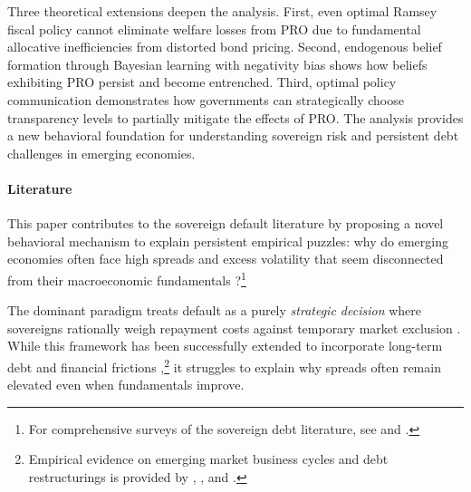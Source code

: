 \documentclass[12pt]{article}
\theoremstyle{plain}
\begin{document}
Three theoretical extensions deepen the analysis. First, even optimal Ramsey
fiscal policy cannot eliminate welfare losses from PRO due to fundamental
allocative inefficiencies from distorted bond pricing. Second, endogenous
belief formation through Bayesian learning with negativity bias shows how
beliefs exhibiting PRO persist and become entrenched. Third, optimal policy
communication demonstrates how governments can strategically choose
transparency levels to partially mitigate the effects of PRO. The analysis
provides a new behavioral foundation for understanding sovereign risk and
persistent debt challenges in emerging economies.

\paragraph{Literature} This paper contributes to the sovereign default literature by proposing a novel
behavioral mechanism to explain persistent empirical puzzles: why do emerging
economies often face high spreads and excess volatility that seem disconnected
from their macroeconomic fundamentals \citep{TomzWright2013,
	MitchenerTrebesch2023}?\footnote{For comprehensive surveys of the sovereign
	debt literature, see \citep{MeyerReinhartTrebesch2022} and \citep{Abbas2019}.}

The dominant paradigm treats default as a purely \textit{strategic decision}
where sovereigns rationally weigh repayment costs against temporary market
exclusion \citep{EatonGersovitz1981, AguiarGopinath2007, Arellano2008}. While
this framework has been successfully extended to incorporate long-term debt and
financial frictions \citep{HatchondoMartinez2009, ChatterjeeEyigungor2012,
	MendozaYue2012},\footnote{Empirical evidence on emerging market business cycles
	and debt restructurings is provided by \citep{NeumeyerPerri2005},
	\citep{CrucesTrebesch2013}, and \citep{ArellanoRamanarayanan2012}.} it
struggles to explain why spreads often remain elevated even when fundamentals
improve.
\end{document}
